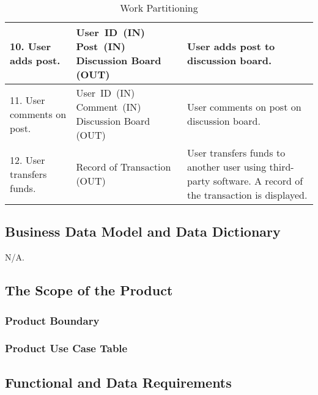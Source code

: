 \documentclass[12pt, titlepage]{article}
\begin{document}
\begin{table}
\begin{tabular}{|p{5cm}|p{5cm}|p{5cm}|}
\hline
10. User adds post. & \mbox{User ID (IN)} \linebreak \mbox{Post (IN)} \linebreak Discussion Board (OUT) & User adds post to discussion board. \\
\hline
11. User comments on post. & \mbox{User ID (IN)} \linebreak \mbox{Comment (IN)} \linebreak Discussion Board (OUT) & User comments on post on discussion board. \\
\hline
12. User transfers funds. & Record of Transaction (OUT) & User transfers funds to another user using third-party software. A record of the transaction is displayed. \\
\hline
\end{tabular}
\caption{Work Partitioning}
\end{table}

\subsection{Business Data Model and Data Dictionary}
N/A.
\subsection{The Scope of the Product}

\subsubsection{Product Boundary}
\subsubsection{Product Use Case Table}
\subsection{Functional and Data Requirements}
\end{document}
